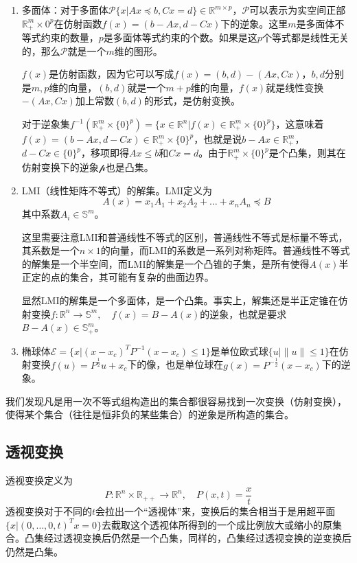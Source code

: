 \documentclass[12pt,a4paper]{book}
\begin{document}
\begin{enumerate}
    \item 多面体：对于多面体$\mathcal{P}\{x|Ax\preceq b,Cx=d\}\in\mathbb{R}^{m\times p}$，$\mathcal{P}$可以表示为实空间正部$\mathbb{R}^m_+\times {0}^p$在仿射函数$f(x)=(b-Ax,d-Cx)$下的逆象。这里$m$是多面体不等式约束的数量，$p$是多面体等式约束的个数。如果是这$p$个等式都是线性无关的，那么$\mathcal{P}$就是一个$m$维的图形。
    
    $f(x)$是仿射函数，因为它可以写成$f(x)=(b,d) - (Ax,Cx)$，$b,d$分别是$m,p$维的向量，$(b,d)$就是一个$m+p$维的向量，$f(x)$就是线性变换$-(Ax,Cx)$加上常数$(b,d)$的形式，是仿射变换。

    对于逆象集$f^{-1}(\mathbb{R}^m_+\times \{0\}^p)=\{x\in\mathbb{R}^n|f(x)\in\mathbb{R}^m_+\times\{0\}^p\}$，这意味着$f(x)=(b-Ax,d-Cx)\in\mathbb{R}^m_+\times\{0\}^p$，也就是说$b-Ax\in\mathbb{R}^m_+$，$d-Cx\in\{0\}^p$，移项即得$Ax\leq b$和$Cx=d$。由于$\mathbb{R}^m_+\times\{0\}^p$是个凸集，则其在仿射变换下的逆象$\mathcal{p}$也是凸集。
    \item LMI（线性矩阵不等式）的解集。LMI定义为
    $$A(x) = x_1A_1+x_2A_2+\ldots+x_nA_n \preceq B$$
    其中系数$A_i \in \mathbb{S}^m$。

    这里需要注意LMI和普通线性不等式的区别，普通线性不等式是标量不等式，其系数是一个$n\times 1$的向量，而LMI的系数是一系列对称矩阵。普通线性不等式的解集是一个半空间，而LMI的解集是一个凸锥的子集，是所有使得$A(x)$半正定的点的集合，其可能有复杂的曲面边界。

    显然LMI的解集是一个多面体，是一个凸集。事实上，解集还是半正定锥在仿射变换$f:\mathbb{R}^n\to\mathbb{S}^m,\quad f(x)=B-A(x)$的逆象，也就是要求$B-A(x)\in\mathbb{S}^m_+$。

    \item 椭球体$\mathcal{E}=\{x|(x-x_c)^TP^{-1}(x-x_c)\leq 1\}$是单位欧式球$\{u|\|u\|\leq 1\}$在仿射变换$f(u)=P^{\frac{1}{2}}u+x_c$下的像，也是单位球在$g(x)=P^{-\frac{1}{2}}(x-x_c)$下的逆象。
\end{enumerate}

我们发现凡是用一次不等式组构造出的集合都很容易找到一次变换（仿射变换），使得某个集合（往往是恒非负的某些集合）的逆象是所构造的集合。

\subsection{透视变换}

透视变换定义为
\begin{equation}
    P:\mathbb{R}^n\times\mathbb{R}_{++} \to\mathbb{R}^n,\quad P(x,t)=\frac{x}{t}
\end{equation}
透视变换对于不同的$t$会拉出一个“透视体”来，变换后的集合相当于是用超平面$\{x|(0,\ldots,0,t)^Tx=0\}$去截取这个透视体所得到的一个成比例放大或缩小的原集合。凸集经过透视变换后仍然是一个凸集，同样的，凸集经过透视变换的逆变换后仍然是凸集。
\end{document}
